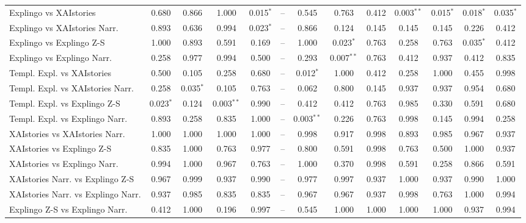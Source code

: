 \begin{table}[!htb]
{\begin{tabular}{lcccccccccccc}
    Explingo vs XAIstories & 0.680 & 0.866 & 1.000 & \cellcolor[HTML]{DFF5DC}0.015$^{*}$ & -- & 0.545 & 0.763 & 0.412 & \cellcolor[HTML]{90EE90}0.003$^{**}$ & \cellcolor[HTML]{DFF5DC}0.015$^{*}$ & \cellcolor[HTML]{DFF5DC}0.018$^{*}$ & \cellcolor[HTML]{DFF5DC}0.035$^{*}$ \\
    Explingo vs XAIstories Narr. & 0.893 & 0.636 & 0.994 & \cellcolor[HTML]{DFF5DC}0.023$^{*}$ & -- & 0.866 & 0.124 & 0.145 & 0.145 & 0.145 & 0.226 & 0.412 \\
    Explingo vs Explingo Z-S & 1.000 & 0.893 & 0.591 & 0.169 & -- & 1.000 & \cellcolor[HTML]{DFF5DC}0.023$^{*}$ & 0.763 & 0.258 & 0.763 & \cellcolor[HTML]{DFF5DC}0.035$^{*}$ & 0.412 \\
    Explingo vs Explingo Narr. & 0.258 & 0.977 & 0.994 & 0.500 & -- & 0.293 & \cellcolor[HTML]{90EE90}0.007$^{**}$ & 0.763 & 0.412 & 0.937 & 0.412 & 0.835 \\
    Templ. Expl. vs XAIstories & 0.500 & 0.105 & 0.258 & 0.680 & -- & \cellcolor[HTML]{DFF5DC}0.012$^{*}$ & 1.000 & 0.412 & 0.258 & 1.000 & 0.455 & 0.998 \\
    Templ. Expl. vs XAIstories Narr. & 0.258 & \cellcolor[HTML]{DFF5DC}0.035$^{*}$ & 0.105 & 0.763 & -- & 0.062 & 0.800 & 0.145 & 0.937 & 0.937 & 0.954 & 0.680 \\
    Templ. Expl. vs Explingo Z-S & \cellcolor[HTML]{DFF5DC}0.023$^{*}$ & 0.124 & \cellcolor[HTML]{90EE90}0.003$^{**}$ & 0.990 & -- & 0.412 & 0.412 & 0.763 & 0.985 & 0.330 & 0.591 & 0.680 \\
    Templ. Expl. vs Explingo Narr. & 0.893 & 0.258 & 0.835 & 1.000 & -- & \cellcolor[HTML]{90EE90}0.003$^{**}$ & 0.226 & 0.763 & 0.998 & 0.145 & 0.994 & 0.258 \\
    XAIstories vs XAIstories Narr. & 1.000 & 1.000 & 1.000 & 1.000 & -- & 0.998 & 0.917 & 0.998 & 0.893 & 0.985 & 0.967 & 0.937 \\
    XAIstories vs Explingo Z-S & 0.835 & 1.000 & 0.763 & 0.977 & -- & 0.800 & 0.591 & 0.998 & 0.763 & 0.500 & 1.000 & 0.937 \\
    XAIstories vs Explingo Narr. & 0.994 & 1.000 & 0.967 & 0.763 & -- & 1.000 & 0.370 & 0.998 & 0.591 & 0.258 & 0.866 & 0.591 \\
    XAIstories Narr. vs Explingo Z-S & 0.967 & 0.999 & 0.937 & 0.990 & -- & 0.977 & 0.997 & 0.937 & 1.000 & 0.937 & 0.990 & 1.000 \\
    XAIstories Narr. vs Explingo Narr. & 0.937 & 0.985 & 0.835 & 0.835 & -- & 0.967 & 0.967 & 0.937 & 0.998 & 0.763 & 1.000 & 0.994 \\
    Explingo Z-S vs Explingo Narr. & 0.412 & 1.000 & 0.196 & 0.997 & -- & 0.545 & 1.000 & 1.000 & 1.000 & 1.000 & 0.937 & 0.994 \\
    \bottomrule
    \end{tabular}
}
\end{table}
